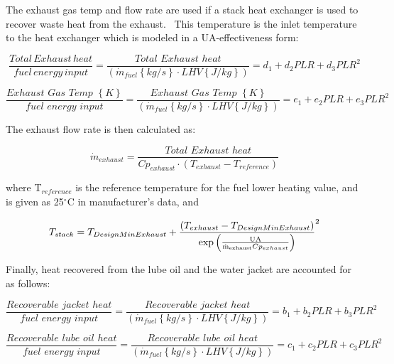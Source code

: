 The exhaust gas temp and flow rate are used if a stack heat exchanger is used to recover waste heat from the exhaust.~ This temperature is the inlet temperature to the heat exchanger which is modeled in a UA-effectiveness form:

\begin{equation}
\frac{{Total\,Exhaust\,heat}}{{fuel\,energy\,input}} = \frac{{Total\,\,Exhaust\,\,heat}}{{\left( {{{\dot m}_{fuel}}\left\{ {kg/s} \right\} \cdot LHV\left\{ {J/kg} \right\}} \right)}} = {d_1} + {d_2}PLR + {d_3}PL{R^2}
\end{equation}

\begin{equation}
\frac{{Exhaust\,\,Gas\,\,Temp\,\,\left\{ K \right\}}}{{fuel\,\,energy\,\,input}} = \frac{{Exhaust\,\,Gas\,\,Temp\,\,\left\{ K \right\}}}{{\left( {{{\dot m}_{fuel}}\left\{ {kg/s} \right\} \cdot LHV\left\{ {J/kg} \right\}} \right)}} = {e_1} + {e_2}PLR + {e_3}PL{R^2}
\end{equation}

The exhaust flow rate is then calculated as:

\begin{equation}
{\dot m_{exhaust}} = \frac{{Total\,\,Exhaust\,\,heat}}{{C{p_{exhaust}} \cdot \left( {{T_{exhaust}} - {T_{reference}}} \right)}}
\end{equation}

where T\(_{reference}\) is the reference temperature for the fuel lower heating value, and is given as 25\(^{\circ}\)C in manufacturer's data, and

\begin{equation}
{T_{stack}} = {T_{DesignMinExhaust}} + {\frac{{\left( {{T_{exhaust}} - {T_{DesignMinExhaust}}} \right)}}{{{\rm{exp}}\left( {\frac{{{\rm{UA}}}}{{{{{\rm{\dot m}}}_{{\rm{exhaust}}}}C{p_{exhaust}}}}} \right)}}^2}
\end{equation}

Finally, heat recovered from the lube oil and the water jacket are accounted for as follows:

\begin{equation}
\frac{{Recoverable\,\,jacket\,\,heat}}{{fuel\,\,energy\,\,input}} = \frac{{Recoverable\,\,jacket\,\,heat}}{{\left( {{{\dot m}_{fuel}}\left\{ {kg/s} \right\} \cdot LHV\left\{ {J/kg} \right\}} \right)}} = {b_1} + {b_2}PLR + {b_3}PL{R^2}
\end{equation}

\begin{equation}
\frac{{Recoverable\,\,lube\,\,oil\,\,heat}}{{fuel\,\,energy\,\,input}} = \frac{{Recoverable\,\,lube\,\,oil\,\,heat}}{{\left( {{{\dot m}_{fuel}}\left\{ {kg/s} \right\} \cdot LHV\left\{ {J/kg} \right\}} \right)}} = {c_1} + {c_2}PLR + {c_3}PL{R^2}
\end{equation}

